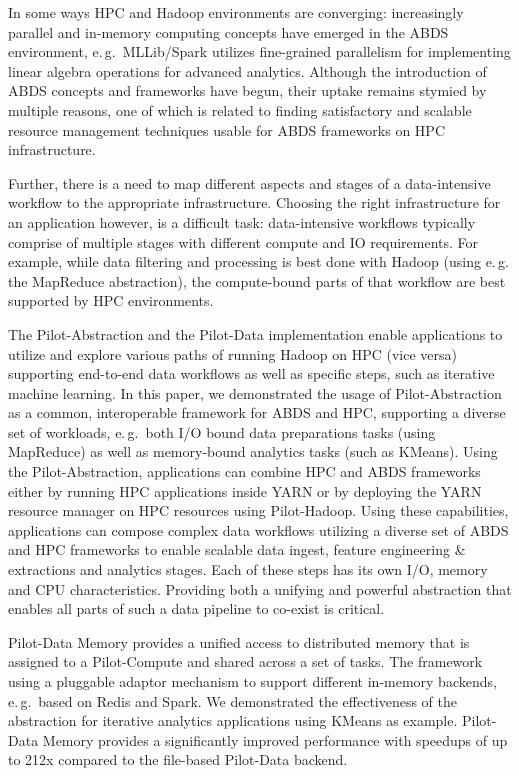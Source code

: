 \documentclass{sig-alternate}
\newcommand{\pilot}{Pilot\xspace}
\newcommand{\pilotcompute}{Pilot-Compute\xspace}
\newcommand{\pilotdata}{Pilot-Data\xspace}
\newcommand{\pilotdatainmem}{Pilot-Data Memory\xspace}
\begin{document}
In some ways HPC and Hadoop environments are converging: increasingly parallel
and in-memory computing concepts have emerged in the ABDS environment, e.\,g.\
MLLib/Spark utilizes fine-grained parallelism for implementing linear algebra
operations for advanced analytics. Although the introduction of ABDS concepts
and frameworks have begun, their uptake remains stymied by multiple reasons,
one of which is related to finding satisfactory and scalable resource
management techniques usable for ABDS frameworks on HPC infrastructure.

Further, there is a need to map different aspects and stages of a data-intensive
workflow to the appropriate infrastructure. Choosing the right infrastructure
for an application however, is a difficult task: data-intensive workflows
typically comprise of multiple stages with different compute and IO
requirements. For example, while data filtering and processing is best done
with Hadoop (using e.\,g. the MapReduce abstraction), the compute-bound parts of
that workflow are best supported by HPC environments. 



The \pilot-Abstraction and the \pilotdata implementation enable applications to
utilize and explore various paths of running Hadoop on HPC (vice versa)
supporting end-to-end data workflows as well as specific steps, such as
iterative machine learning. In this paper, we demonstrated the usage of
\pilot-Abstraction as a common, interoperable framework for ABDS and HPC,
supporting a diverse set of workloads, e.\,g.\ both I/O bound data preparations
tasks (using MapReduce) as well as memory-bound analytics tasks (such as
KMeans). Using the \pilot-Abstraction, applications can combine HPC and ABDS
frameworks either by running HPC applications inside YARN or by
deploying the YARN resource manager on HPC resources using \pilot-Hadoop. Using
these capabilities, applications can compose complex data workflows utilizing a
diverse set of ABDS and HPC frameworks to enable scalable data ingest, feature
engineering \& extractions and analytics stages. Each of these steps has its
own I/O, memory and CPU characteristics. Providing both a unifying and powerful
abstraction that enables all parts of such a data pipeline to co-exist is
critical.

\pilotdatainmem provides a unified access to distributed memory that is
assigned to a \pilotcompute and shared across a set of tasks. The framework
using a pluggable adaptor mechanism to support different in-memory backends,
e.\,g.\ based on Redis and Spark. We demonstrated the effectiveness of the
abstraction for iterative analytics applications using KMeans as example.
\pilotdatainmem provides a significantly improved performance with speedups of
up to 212x compared to the file-based \pilotdata backend.
\end{document}
